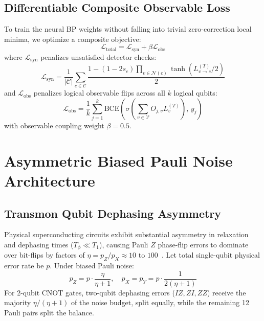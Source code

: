 \documentclass[journal]{IEEEtran}
\begin{document}
\subsection{Differentiable Composite Observable Loss}
To train the neural BP weights without falling into trivial zero-correction local minima, we optimize a composite objective:
\begin{equation}
    \mathcal{L}_{\text{total}} = \mathcal{L}_{\text{syn}} + \beta \mathcal{L}_{\text{obs}}
\end{equation}
where $\mathcal{L}_{\text{syn}}$ penalizes unsatisfied detector checks:
\begin{equation}
    \mathcal{L}_{\text{syn}} = \frac{1}{|\mathcal{C}|} \sum_{c \in \mathcal{C}} \frac{1 - (1 - 2 s_c) \prod_{v \in \mathcal{N}(c)} \tanh(L_{v \to c}^{(T)} / 2)}{2}
\end{equation}
and $\mathcal{L}_{\text{obs}}$ penalizes logical observable flips across all $k$ logical qubits:
\begin{equation}
    \mathcal{L}_{\text{obs}} = \frac{1}{k} \sum_{j=1}^k \text{BCE}\left( \sigma\left( \sum_{v \in \mathcal{V}} O_{j, v} L_v^{(T)} \right), \, y_j \right)
\end{equation}
with observable coupling weight $\beta = 0.5$.

\section{Asymmetric Biased Pauli Noise Architecture}

\subsection{Transmon Qubit Dephasing Asymmetry}
Physical superconducting circuits exhibit substantial asymmetry in relaxation and dephasing times ($T_\phi \ll T_1$), causing Pauli $Z$ phase-flip errors to dominate over bit-flips by factors of $\eta = p_Z / p_X \approx 10$ to $100$~\cite{tuckett2018ultrahigh}.
Let total single-qubit physical error rate be $p$. Under biased Pauli noise:
\begin{equation}
    p_Z = p \cdot \frac{\eta}{\eta + 1}, \quad p_X = p_Y = p \cdot \frac{1}{2(\eta + 1)}
\end{equation}
For 2-qubit CNOT gates, two-qubit dephasing errors ($IZ, ZI, ZZ$) receive the majority $\eta/(\eta+1)$ of the noise budget, split equally, while the remaining 12 Pauli pairs split the balance.
\end{document}
